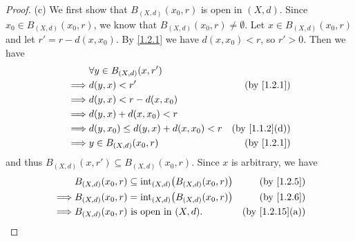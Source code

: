 \begin{proof}{(c)}
  We first show that \(B_{(X, d)}(x_0, r)\) is open in \((X, d)\).
  Since \(x_0 \in B_{(X, d)}(x_0, r)\), we know that \(B_{(X, d)}(x_0, r) \neq \emptyset\).
  Let \(x \in B_{(X, d)}(x_0, r)\) and let \(r' = r - d(x, x_0)\).
  By \cref{1.2.1} we have \(d(x, x_0) < r\), so \(r' > 0\).
  Then we have
  \begin{align*}
             & \forall y \in B_{(X, d)}(x, r')                                      \\
    \implies & d(y, x) < r'                           & \text{(by \cref{1.2.1})}    \\
    \implies & d(y, x) < r - d(x, x_0)                                              \\
    \implies & d(y, x) + d(x, x_0) < r                                              \\
    \implies & d(y, x_0) \leq d(y, x) + d(x, x_0) < r & \text{(by \cref{1.1.2}(d))} \\
    \implies & y \in B_{(X, d)}(x_0, r)               & \text{(by \cref{1.2.1})}
  \end{align*}
  and thus \(B_{(X, d)}(x, r') \subseteq B_{(X, d)}(x_0, r)\).
  Since \(x\) is arbitrary, we have
  \begin{align*}
             & B_{(X, d)}(x_0, r) \subseteq \text{int}_{(X, d)}\big(B_{(X, d)}(x_0, r)\big) & \text{(by \cref{1.2.5})}     \\
    \implies & B_{(X, d)}(x_0, r) = \text{int}_{(X, d)}\big(B_{(X, d)}(x_0, r)\big)         & \text{(by \cref{1.2.6})}     \\
    \implies & B_{(X, d)}(x_0, r) \text{ is open in } (X, d).                               & \text{(by \cref{1.2.15}(a))}
  \end{align*}


\end{proof}
